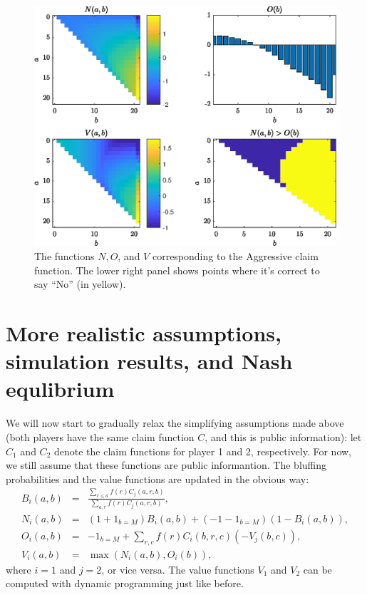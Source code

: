 \documentclass[12pt]{article}
\begin{document}
\begin{figure}
  \includegraphics[width=\linewidth]{valueA.eps}
  \caption{The functions $N, O$, and $V$ corresponding to the Aggressive claim function. The lower right panel shows points where it's correct to say ``No'' (in yellow).}
  \label{Ca}
\end{figure}

\section{\large{More realistic assumptions, simulation results, and Nash equlibrium}}\label{Simulation}
We will now start to gradually relax the simplifying assumptions made above (both players have the same claim function $C$, and this is public information): let $C_1$ and $C_2$ denote the claim functions for player 1 and 2, respectively. For now, we still assume that these functions are public informantion. The bluffing probabilities and the value functions are updated in the obvious way:
\begin{eqnarray*}
B_i(a,b) &=& \frac{\sum_{r \leq a}f(r)C_j(a,r,b)}{\sum_{a,r}f(r)C_j(a,r,b)},\label{bluff_ij}\\
N_i(a,b) &=& (1 + 1_{b = M})B_i(a,b) + (-1 - 1_{b = M})(1-B_i(a,b)),\label{N_ij}\\
O_i(a,b) &=& -1_{b = M} + \sum_{r,c}f(r)C_i(b,r,c)(-V_j(b,c)),\\
V_i(a,b) &=& \max(N_i(a,b),O_i(b)),
\end{eqnarray*}
where $i = 1$ and $j = 2$, or vice versa. The value functions $V_1$ and $V_2$ can be computed with dynamic programming just like before.
\end{document}
